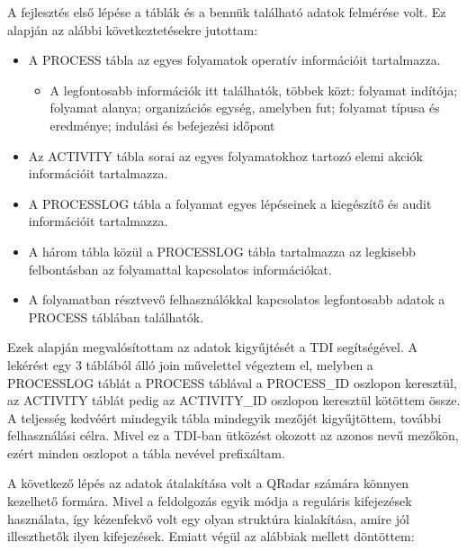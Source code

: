 A fejlesztés első lépése a táblák és a bennük található adatok felmérése volt. Ez alapján az alábbi következtetésekre jutottam:

\begin{itemize}
	\item A PROCESS tábla az egyes folyamatok operatív információit tartalmazza. 
	
	\begin{itemize}
		\item A legfontosabb információk itt találhatók, többek közt: folyamat indítója; folyamat alanya; organizációs egység, amelyben fut; folyamat típusa és eredménye; indulási és befejezési időpont
	\end{itemize}
	
	\item Az ACTIVITY tábla sorai az egyes folyamatokhoz tartozó elemi akciók információit tartalmazza.
	
	\item A PROCESSLOG tábla a folyamat egyes lépéseinek a kiegészítő és audit információit tartalmazza.
	
	\item A három tábla közül a PROCESSLOG tábla tartalmazza az legkisebb felbontásban az folyamattal kapcsolatos információkat.
	
	\item A folyamatban résztvevő felhasználókkal kapcsolatos legfontosabb adatok a PROCESS táblában találhatók.
\end{itemize}

Ezek alapján megvalósítottam az adatok kigyűjtését a TDI segítségével. A lekérést egy 3 táblából álló join művelettel végeztem el, melyben a PROCESSLOG táblát a PROCESS táblával a PROCESS\_ID oszlopon keresztül, az ACTIVITY táblát pedig az ACTIVITY\_ID oszlopon keresztül kötöttem össze. A teljesség kedvéért mindegyik tábla mindegyik mezőjét kigyűjtöttem, további felhasználási célra. Mivel ez a TDI-ban ütközést okozott az azonos nevű mezőkön, ezért minden oszlopot a tábla nevével prefixáltam.

A következő lépés az adatok átalakítása volt a QRadar számára könnyen kezelhető formára. Mivel a feldolgozás egyik módja a reguláris kifejezések használata, így kézenfekvő volt egy olyan struktúra kialakítása, amire jól illeszthetők ilyen kifejezések. Emiatt végül az alábbiak mellett döntöttem:

